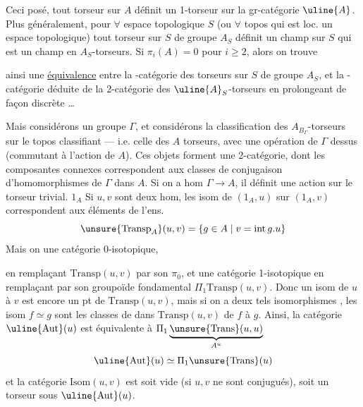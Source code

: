 Ceci posé, tout torseur sur \(A\) définit un 1-torseur sur la gr-catégorie \(\uline{A}\). Plus généralement, pour \(\forall\) espace topologique \(S\) (ou \(\forall\) topos qui est loc. un espace topologique) tout torseur sur \(S\) de groupe \(A_S\) définit un champ sur \(S\) qui est un  champ en \(A_S\)-torseurs. Si \(\pi_i(A)=0\) pour \(i\geq2\), alors on trouve



ainsi  une  \uline{équivalence} entre la -catégorie des torseurs sur \(S\) de groupe \(A_S\), et la -catégorie déduite de la 2-catégorie des  \(\uline{A}_S\)-torseurs en  prolongeant de façon discrète \ldots

Mais considérons  un groupe \(\Gamma\), et considérons la classification des \(A_{B_\Gamma}\)-torseurs sur le topos classifiant --- i.e. celle des \(A\) torseurs, avec une opération de \(\Gamma\) dessus (commutant à l'action de \(A\)). Ces objets forment une 2-catégorie, dont les composantes connexes correspondent aux classes de conjugaison d'homomorphismes de \(\Gamma\) dans \(A\). Si on a   hom \(\Gamma\to A\), il définit  une action sur le torseur trivial. \(1_A\) Si \(u,v\) sont deux hom, les isom de \((1_A,u)\) sur \((1_A,v)\) correspondent aux éléments de l'ens. 
\[
\unsure{\mathrm{Transp}_A}(u,v)=\{g\in A\mid v=\mathrm{int}\,g.u\}
\]
Mais on  une catégorie 0-isotopique,



en remplaçant \(\mathrm{Transp}(u,v)\) par son \(\pi_0\), et une catégorie 1-isotopique en  remplaçant par son groupoïde fondamental \(\Pi_1\mathrm{Transp}(u,v)\). Donc un isom de \(u\) à \(v\) est encore un pt de \(\mathrm{Transp}(u,v)\), mais si on a deux tels isomorphismes , les isom \(f\simeq g\) sont les classes de  dans \(\mathrm{Transp}(u,v)\) de \(f\) à \(g\). Ainsi, la catégorie \(\uline{\mathrm{Aut}}(u)\) est équivalente à \(\Pi_1\underbrace{\unsure{\mathrm{Trans}}(u,u)}_{A^u}\) 
\[
\uline{\mathrm{Aut}}(u)\simeq\Pi_1\unsure{\mathrm{Trans}}(u)
\]
et la  catégorie \(\mathrm{Isom}(u,v)\) est soit vide (si \(u,v\) ne sont conjugués), soit un torseur sous \(\uline{\mathrm{Aut}}(u)\).

